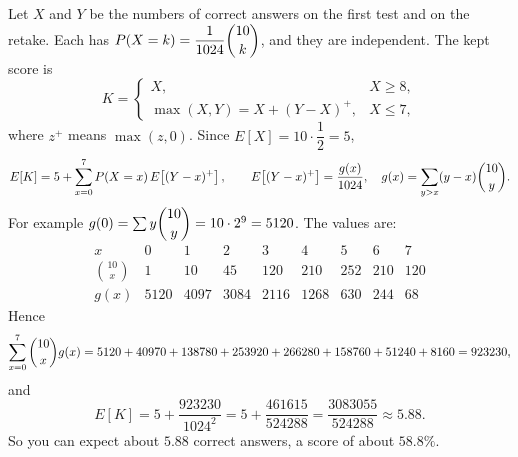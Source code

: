 Let $X$ and $Y$ be the numbers of correct answers on the first test and on the retake. Each has $P(X=k)=\dfrac{1}{1024}\dbinom{10}{k}$, and they are independent. The kept score is
\[K=\begin{cases}X,& X\ge8,\\ \max(X,Y)=X+(Y-X)^{+},& X\le7,\end{cases}\]
where $z^{+}$ means $\max(z,0)$. Since $E[X]=10\cdot\dfrac{1}{2}=5$,
\[E[K]=5+\sum_{x=0}^{7}P(X=x)\,E\!\left[(Y-x)^{+}\right],\qquad E\!\left[(Y-x)^{+}\right]=\dfrac{g(x)}{1024},\quad g(x)=\sum_{y>x}(y-x)\dbinom{10}{y}.\]
For example $g(0)=\sum y\dbinom{10}{y}=10\cdot2^9=5120$. The values are:
\[\begin{array}{c|cccccccc}
x&0&1&2&3&4&5&6&7\\\hline
\binom{10}{x}&1&10&45&120&210&252&210&120\\
g(x)&5120&4097&3084&2116&1268&630&244&68
\end{array}\]
Hence
\[\sum_{x=0}^{7}\dbinom{10}{x}g(x)=5120+40970+138780+253920+266280+158760+51240+8160=923230,\]
and
\[E[K]=5+\dfrac{923230}{1024^2}=5+\dfrac{461615}{524288}=\boxed{\dfrac{3083055}{524288}}\approx5.88 .\]
So you can expect about $5.88$ correct answers, a score of about $\boxed{58.8\%}$.
